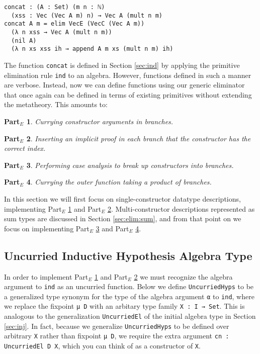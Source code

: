 \documentclass[nonatbib]{sigplanconf}
\newtheorem{myparte}{Part$_E$}
\newcommand{\refsec}[1]{Section \ref{sec:#1}}
\newcommand{\refparte}[1]{Part$_E$ \ref{parte:#1}}
\begin{document}
\begin{verbatim}
concat : (A : Set) (m n : ℕ)
  (xss : Vec (Vec A m) n) → Vec A (mult n m)
concat A m = elim VecE (VecC (Vec A m))
  (λ n xss → Vec A (mult n m))
  (nil A)
  (λ n xs xss ih → append A m xs (mult n m) ih)
\end{verbatim}

The function {\tt concat} is defined in \refsec{ind} by applying the
primitive elimination rule {\tt ind} to an algebra. However,
functions defined in such a manner are verbose. Instead, now we
can define functions using our generic eliminator that once again can
be defined in terms of existing primitives without extending the
metatheory. This amounts to:

\begin{myparte}
\label{parte:one}
Currying constructor arguments in branches.
\end{myparte}

\begin{myparte}
\label{parte:two}
Inserting an implicit proof in each branch that the constructor has the correct index.
\end{myparte}

\begin{myparte}
\label{parte:three}
Performing case analysis to break up constructors into branches.
\end{myparte}

\begin{myparte}
\label{parte:four}
Currying the outer function taking a product of branches.
\end{myparte}

In this section we will first focus on single-constructor
datatype descriptions, implementing \refparte{one} and \refparte{two}.
Multi-constructor descriptions represented as sum types are
discussed in \refsec{elim:sum}, and from that point on we focus on
implementing \refparte{three} and \refparte{four}.

\subsection{Uncurried Inductive Hypothesis Algebra Type}

In order to implement
\refparte{one} and \refparte{two} we must recognize the algebra
argument to {\tt ind} as an uncurried function.
Below we define {\tt UncurriedHyps} to be a generalized type synonym
for the type of the algebra argument {\tt α} to {\tt ind}, where we
replace the fixpoint
{\tt μ D} with an arbitary type family {\tt X : I → Set}. This is
analogous to the generalization {\tt UncurriedEl} of the initial
algebra type in \refsec{inj}. In fact, because we generalize
{\tt UncurriedHyps} to be defined over arbitrary {\tt X} rather than
fixpoint {\tt μ D}, we require the extra argument
{\tt cn : UncurriedEl D X}, which you can think of as a
constructor of {\tt X}.
\end{document}
